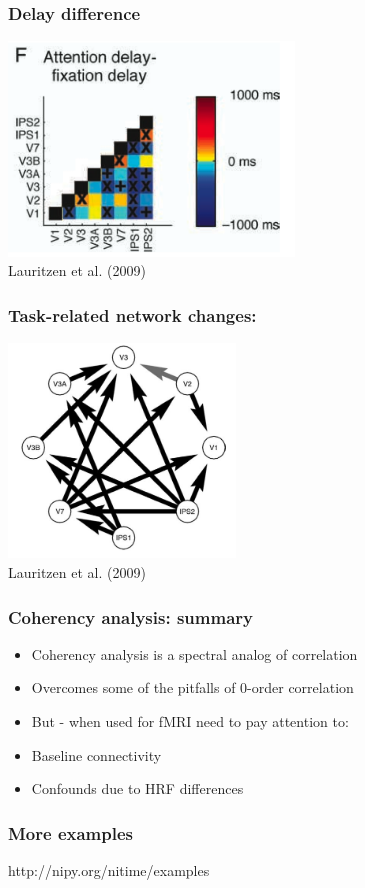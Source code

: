 \documentclass{beamer}
\begin{document}
\begin{frame}
\frametitle{Delay difference}
\includegraphics[height=5.7cm]{figures/lauritzen7}
\\
\hfill 
Lauritzen et al. (2009)
\end{frame}

\begin{frame}
\frametitle{Task-related network changes:}
\includegraphics[height=5.7cm]{figures/lauritzen8}
\\
\hfill 
Lauritzen et al. (2009)
\end{frame}

\begin{frame}
\frametitle{Coherency analysis: summary}
\pause
\begin{itemize}
\item
Coherency analysis is a spectral analog of correlation
\pause
\item 
Overcomes some of the pitfalls of 0-order correlation
\pause
\item
But - when used for fMRI need to pay attention to: 
\pause
\item  
Baseline connectivity
\pause
\item
Confounds due to HRF differences
\end{itemize}
\end{frame}

\begin{frame}
\frametitle{More examples}
http://nipy.org/nitime/examples
\end{frame}
\end{document}
